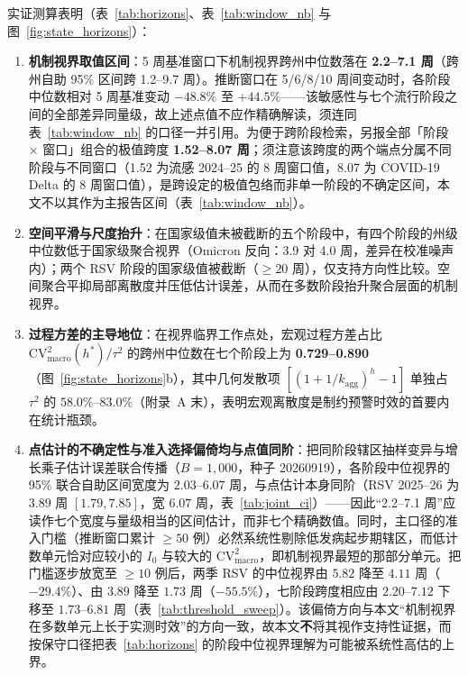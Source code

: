 \documentclass[10pt,UTF8,a4paper,zihao=-4]{ctexart}
\theoremstyle{plain}
\theoremstyle{definition}
\theoremstyle{remark}
\begin{document}
实证测算表明（表~\ref{tab:horizons}、表~\ref{tab:window_nb} 与图~\ref{fig:state_horizons}）：
\begin{enumerate}
\item \textbf{机制视界取值区间}：5 周基准窗口下机制视界跨州中位数落在 \textbf{2.2--7.1 周}（跨州自助 95\% 区间跨 1.2--9.7 周）。推断窗口在 5/6/8/10 周间变动时，各阶段中位数相对 5 周基准变动 $-48.8\%$ 至 $+44.5\%$——该敏感性与七个流行阶段之间的全部差异同量级，故上述点值不应作精确解读，须连同表~\ref{tab:window_nb} 的口径一并引用。为便于跨阶段检索，另报全部「阶段 $\times$ 窗口」组合的极值跨度 \textbf{1.52--8.07 周}；须注意该跨度的两个端点分属不同阶段与不同窗口（1.52 为流感 2024--25 的 8 周窗口值，8.07 为 COVID-19 Delta 的 8 周窗口值），是跨设定的极值包络而非单一阶段的不确定区间，本文不以其作为主报告区间（表~\ref{tab:window_nb}）。
\item \textbf{空间平滑与尺度抬升}：在国家级值未被截断的五个阶段中，有四个阶段的州级中位数低于国家级聚合视界（Omicron 反向：3.9 对 4.0 周，差异在校准噪声内）；两个 RSV 阶段的国家级值被截断（$\ge 20$ 周），仅支持方向性比较。空间聚合平抑局部离散度并压低估计误差，从而在多数阶段抬升聚合层面的机制视界。
\item \textbf{过程方差的主导地位}：在视界临界工作点处，宏观过程方差占比 $\text{CV}^2_{\text{macro}}(h^*)/\tau^2$ 的跨州中位数在七个阶段上为 \textbf{0.729--0.890}（图~\ref{fig:state_horizons}b），其中几何发散项 $[(1+1/k_{\text{agg}})^h-1]$ 单独占 $\tau^2$ 的 $58.0\%$--$83.0\%$（附录~A 末），表明宏观离散度是制约预警时效的首要内在统计瓶颈。
\item \textbf{点估计的不确定性与准入选择偏倚均与点值同阶}：把同阶段辖区抽样变异与增长乘子估计误差联合传播（$B=1{,}000$，种子 20260919），各阶段中位视界的 95\% 联合自助区间宽度为 $2.03\text{--}6.07$ 周，与点估计本身同阶（RSV 2025--26 为 $3.89$ 周 $[1.79, 7.85]$，宽 $6.07$ 周，表~\ref{tab:joint_ci}）——因此“2.2--7.1 周”应读作七个宽度与量级相当的区间估计，而非七个精确数值。同时，主口径的准入门槛（推断窗口累计 $\ge 50$ 例）必然系统性剔除低发病起步期辖区，而低计数单元恰对应较小的 $I_0$ 与较大的 $\text{CV}^2_{\text{macro}}$，即机制视界最短的那部分单元。把门槛逐步放宽至 $\ge 10$ 例后，两季 RSV 的中位视界由 $5.82$ 降至 $4.11$ 周（$-29.4\%$）、由 $3.89$ 降至 $1.73$ 周（$-55.5\%$），七阶段跨度相应由 $2.20\text{--}7.12$ 下移至 $1.73\text{--}6.81$ 周（表~\ref{tab:threshold_sweep}）。该偏倚方向与本文“机制视界在多数单元上长于实测时效”的方向一致，故本文\textbf{不}将其视作支持性证据，而按保守口径把表~\ref{tab:horizons} 的阶段中位视界理解为可能被系统性高估的上界。
\end{enumerate}
\end{document}
